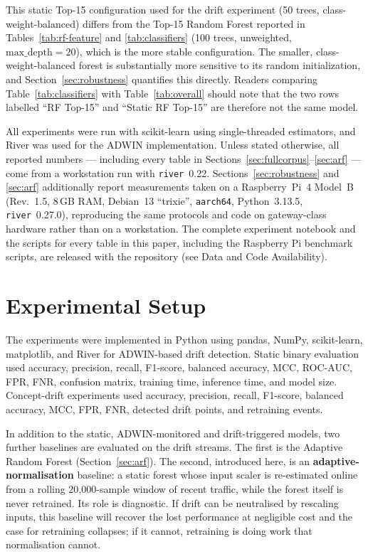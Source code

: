 \documentclass[11pt,a4paper]{article}
\begin{document}
This static Top-15 configuration used for the drift experiment (50
trees, class-weight-balanced) differs from the Top-15 Random Forest
reported in Tables~\ref{tab:rf-feature} and \ref{tab:classifiers} (100
trees, unweighted, $\text{max\_depth} = 20$), which is the more stable
configuration. The smaller, class-weight-balanced forest is
substantially more sensitive to its random initialization, and
Section~\ref{sec:robustness} quantifies this directly. Readers comparing
Table~\ref{tab:classifiers} with Table~\ref{tab:overall} should note
that the two rows labelled ``RF Top-15'' and ``Static RF Top-15'' are
therefore not the same model.

All experiments were run with scikit-learn using single-threaded
estimators, and River was used for the ADWIN implementation. Unless
stated otherwise, all reported numbers --- including every table in
Sections~\ref{sec:fullcorpus}--\ref{sec:arf} --- come from a workstation
run with \texttt{river}~0.22. Sections~\ref{sec:robustness} and
\ref{sec:arf} additionally report measurements taken on a Raspberry~Pi~4
Model~B (Rev.~1.5, 8\,GB RAM, Debian~13 ``trixie'', \texttt{aarch64},
Python~3.13.5, \texttt{river}~0.27.0), reproducing the same protocols and
code on gateway-class hardware rather than on a workstation. The
complete experiment notebook and the scripts for every table in this
paper, including the Raspberry Pi benchmark scripts, are released with
the repository (see Data and Code Availability).

\section{Experimental Setup}
\label{sec:expsetup}

The experiments were implemented in Python using pandas, NumPy,
scikit-learn, matplotlib, and River for ADWIN-based drift detection.
Static binary evaluation used accuracy, precision, recall, F1-score,
balanced accuracy, MCC, ROC-AUC, FPR, FNR, confusion matrix, training
time, inference time, and model size. Concept-drift experiments used
accuracy, precision, recall, F1-score, balanced accuracy, MCC, FPR, FNR,
detected drift points, and retraining events.

In addition to the static, ADWIN-monitored and drift-triggered models, two
further baselines are evaluated on the drift streams. The first is the Adaptive
Random Forest (Section~\ref{sec:arf}). The second, introduced here, is an
\textbf{adaptive-normalisation} baseline: a static forest whose input scaler is
re-estimated online from a rolling 20{,}000-sample window of recent traffic,
while the forest itself is never retrained. Its role is diagnostic. If drift can
be neutralised by rescaling inputs, this baseline will recover the lost
performance at negligible cost and the case for retraining collapses; if it
cannot, retraining is doing work that normalisation cannot.
\end{document}

